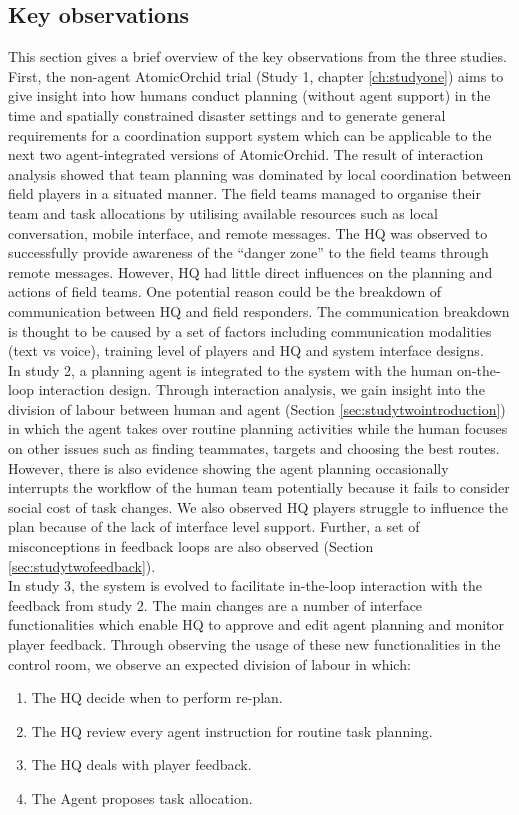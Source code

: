 \subsection{Key observations}\label{sec:conclusionOB}
This section gives a brief overview of the key observations from the three studies. First, the non-agent AtomicOrchid trial (Study 1, chapter \ref{ch:studyone}) aims to give insight into how humans conduct planning (without agent support) in the time and spatially constrained disaster settings and to generate general requirements for a coordination support system which can be applicable to the next two agent-integrated versions of AtomicOrchid. The result of interaction analysis showed that team planning was dominated by local coordination between field players in a situated manner. The field teams managed to organise their team and task allocations by utilising available resources such as local conversation, mobile interface, and remote messages. The HQ was observed to successfully provide awareness of the ``danger zone'' to the field teams through remote messages. However, HQ had little direct influences on the planning and actions of field teams. One potential reason could be the breakdown of communication between HQ and field responders. The communication breakdown is thought to be caused by a set of factors including communication modalities (text vs voice), training level of players and HQ and system interface designs.  \\

In study 2, a planning agent is integrated to the system with the human on-the-loop interaction design.  Through interaction analysis, we gain insight into the division of labour between human and agent (Section \ref{sec:studytwointroduction}) in which the agent takes over routine planning activities while the human focuses on other issues such as finding teammates, targets and choosing the best routes. However, there is also evidence showing the agent planning occasionally interrupts the workflow of the human team potentially because it fails to consider social cost of task changes. We also observed HQ players struggle to influence the plan because of the lack of interface level support. Further, a set of misconceptions in feedback loops are also observed (Section \ref{sec:studytwofeedback}).\\

In study 3, the system is evolved to facilitate in-the-loop interaction with the feedback from study 2. The main changes are a number of interface functionalities which enable HQ to approve and edit agent planning and monitor player feedback. Through observing the usage of these new functionalities in the control room, we observe an expected division of labour in which:
	\begin{enumerate}
	 \item The HQ decide when to perform re-plan.
	 \item The HQ review every agent instruction for routine task planning.
	 \item The HQ deals with player feedback.
	 \item The Agent proposes task allocation.
	\end{enumerate}
	

